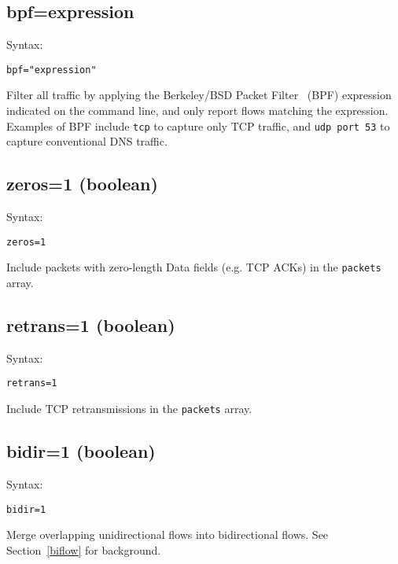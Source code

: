 \documentclass{book}
\begin{document}
\subsection{bpf=expression}
\label{bpf}
\begin{mdframed}[style=aaa]
Syntax:
  \begin{verbatim}
bpf="expression"           
  \end{verbatim}
\end{mdframed}
Filter all traffic by applying the Berkeley/BSD Packet
Filter~\cite{McCanne:1993:BPF:1267303.1267305} (BPF) expression
indicated on the command line, and only report flows matching the
expression.  Examples of BPF include \texttt{tcp} to capture only TCP
traffic, and \texttt{udp port 53} to capture conventional DNS traffic.

\subsection{zeros=1 (boolean)}
\label{zeros}
\begin{mdframed}[style=aaa]
Syntax:
  \begin{verbatim}
zeros=1                    
  \end{verbatim}
\end{mdframed}
Include packets with zero-length Data fields (e.g. TCP ACKs) in the
\texttt{packets} array.  

\subsection{retrans=1 (boolean)}
\label{retrans}
\begin{mdframed}[style=aaa]
Syntax:
  \begin{verbatim}
retrans=1                  
  \end{verbatim}
\end{mdframed}
Include TCP retransmissions in the \texttt{packets} array.

\subsection{bidir=1 (boolean)}
\label{bidir}
\begin{mdframed}[style=aaa]
Syntax:
  \begin{verbatim}
bidir=1                    
  \end{verbatim}
\end{mdframed}
Merge overlapping unidirectional flows into bidirectional flows.
See Section~\ref{biflow} for background.
\end{document}
